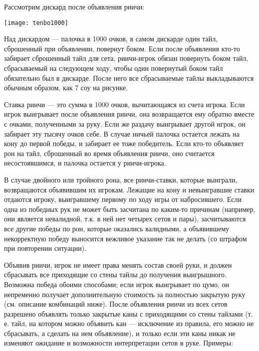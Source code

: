 Рассмотрим дискард после объявления риичи:

\hspace{1.3cm} \texttt{[image: tenbo1000]}



Над дискардом --- палочка в 1000 очков, в самом дискарде один тайл, сброшенный при объявлении, повернут боком. Если после объявления кто-то забирает сброшенный тайл для сета, риичи-игрок обязан повернуть боком тайл, сбрасываемый на следующем ходу, чтобы один повернутый боком тайл обязательно был в дискарде. После него все сбрасываемые тайлы выкладываются обычным образом, как 7 соу на рисунке.

Ставка риичи --- это сумма в 1000 очков, вычитающаяся из счета игрока. Если игрок выигрывает после объявления риичи, она возвращается ему обратно вместе с очками, полученными за руку. Если же раздачу выигрывает другой игрок, он забирает эту тысячу очков себе. В случае ничьей палочка остается лежать на кону до первой победы, и забирает ее тоже победитель. Если кто-то объявляет рон на тайл, сброшенный во время объявления риичи, оно считается несостоявшимся, и палочка остается у риичи-игрока.

В случае двойного или тройного рона, все риичи-ставки, которые выиграли, возвращаются объявившим их игрокам. Лежащие на кону и невыигравшие ставки отдаются игроку, выигравшему первому по ходу игры от набросившего. Если одна из победных рук не может быть засчитана по каким-то причинам (например, они является невалидной, т.к. в ней нет четырех сетов и пары), засчитываются все другие победы по рон, которые оказались валидными, а объявившему некорректную победу выносится вежливое указание так не делать (со штрафом при повторении ситуации).

Объявив риичи, игрок не имеет права менять состав своей руки, и должен сбрасывать все приходящие со стены тайлы до получения выигрышного. Возможна победа обоими способами; если игрок выигрывает по цумо, он непременно получает дополнительную стоимость за полностью закрытую руку (см. описание комбинаций ниже). После объявления риичи из всех сетов разрешено объявлять только закрытые каны с приходящими со стены тайлами (т. е. тайл, на котором можно объявить кан --- исключение из правила, его можно не сбрасывать, а сделать на нем объявление), и только если эти каны никак не изменяют ожидание и возможности интерпретации сетов в руке. Примеры:


